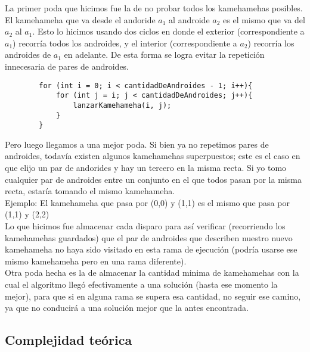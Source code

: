     La primer poda que hicimos fue la de no probar todos los kamehamehas posibles. El kamehameha que va desde el andoride $a_1$ al androide $a_2$ es el mismo que va del $a_2$ al $a_1$. Esto lo hicimos usando dos ciclos en donde el exterior (correspondiente a $a_1$) recorría todos los androides, y el interior (correspondiente a $a_2$) recorría los androides de $a_1$ en adelante. De esta forma se logra evitar la repetición innecesaria de pares de androides. \\

    \begin{codesnippet}
    \begin{verbatim}
        for (int i = 0; i < cantidadDeAndroides - 1; i++){
            for (int j = i; j < cantidadDeAndroides; j++){
                lanzarKamehameha(i, j);
            }
        }
    \end{verbatim}
    \end{codesnippet}

    Pero luego llegamos a una mejor poda. Si bien ya no repetimos pares de androides, todavía existen algunos kamehamehas superpuestos; este es el caso en que elijo un par de andorides y hay un tercero en la misma recta. Si yo tomo cualquier par de androides entre un conjunto en el que todos pasan por la misma recta, estaría tomando el mismo kamehameha. \\

    Ejemplo: El kamehameha que pasa por (0,0) y (1,1) es el mismo que pasa por (1,1) y (2,2) \\

    Lo que hicimos fue almacenar cada disparo para así verificar (recorriendo los kamehamehas guardados) que el par de androides que describen nuestro nuevo kamehameha no haya sido visitado en esta rama de ejecución (podría usarse ese mismo kamehameha pero en una rama diferente). \\

    Otra poda hecha es la de almacenar la cantidad minima de kamehamehas con la cual el algoritmo llegó efectivamente a una solución (hasta ese momento la mejor), para que si en alguna rama se supera esa cantidad, no seguir ese camino, ya que no conducirá a una solución mejor que la antes encontrada. \\  
       
    \subsection{Complejidad teórica}
         
